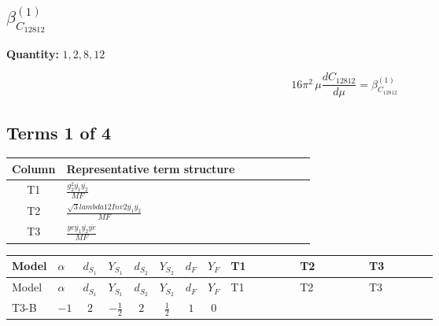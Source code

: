 \documentclass[8pt]{article}
\begin{document}
\begin{landscape}
\section*{$\beta_{C_{12812}}^{(1)}$}
\noindent\textbf{Quantity: }$\mathrm{1,2,8,12}$\par\smallskip
\[16\pi^2\,\mu\frac{d C_{12812}}{d\mu}=\beta_{C_{12812}}^{(1)}\]
\subsection*{Terms 1 of 4}
\begin{center}
\begin{tabular}{@{}c >{\raggedright\arraybackslash}p{0.82\linewidth}@{}}
\toprule
Column & Representative term structure \\
\midrule
T1 & \(\displaystyle \frac{g_{2}^{2} \overline{y_{1}} \overline{y_{2}}}{MF}\) \\
\midrule
T2 & \(\displaystyle \frac{\sqrt{3} lambda12Inv2 \overline{y_{1}} \overline{y_{2}}}{MF}\) \\
\midrule
T3 & \(\displaystyle \frac{ye \overline{y_{1}} \overline{y_{2}} \overline{ye}}{MF}\) \\
\midrule
\bottomrule
\end{tabular}
\end{center}
\smallskip
\tiny
\begin{longtable}{@{}llcccccc >{\raggedright\arraybackslash}p{0.21\linewidth} >{\raggedright\arraybackslash}p{0.21\linewidth} >{\raggedright\arraybackslash}p{0.21\linewidth}@{}}
\toprule
Model & $\alpha$ & $d_{S_1}$ & $Y_{S_1}$ & $d_{S_2}$ & $Y_{S_2}$ & $d_F$ & $Y_F$ & T1 & T2 & T3 \\
\midrule
\endfirsthead
\toprule
Model & $\alpha$ & $d_{S_1}$ & $Y_{S_1}$ & $d_{S_2}$ & $Y_{S_2}$ & $d_F$ & $Y_F$ & T1 & T2 & T3 \\
\midrule
\endhead
T3-B & $-1$ & $2$ & $-\frac{1}{2}$ & $2$ & $\frac{1}{2}$ & $1$ & $0$ & \scriptsize\adjustbox{max width=\linewidth}{$\begin{gathered} - \frac{3 g_{2}^{2} \overline{y_{1}} \overline{y_{2}}}{8 MF}\end{gathered}$} & \scriptsize\adjustbox{max width=\linewidth}{$\begin{gathered} - \frac{\sqrt{3} lambda12Inv2 \overline{y_{1}} \overline{y_{2}}}{6 MF}\end{gathered}$} & \scriptsize\adjustbox{max width=\linewidth}{$\begin{gathered} \frac{ye \overline{y_{1}} \overline{y_{2}} \overline{ye}}{8 MF}\end{gathered}$} \\

\end{longtable}
\end{landscape}
\end{document}

